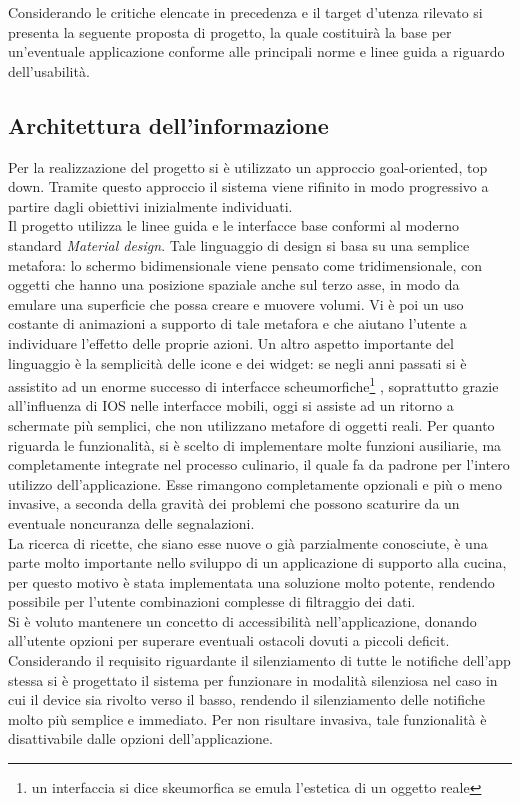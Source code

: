 Considerando le critiche elencate in precedenza e il target d'utenza rilevato si
presenta la seguente proposta di progetto, la quale costituirà la base per
un'eventuale applicazione conforme alle principali norme e linee guida a
riguardo dell'usabilità.

\subsection{Architettura dell'informazione}
Per la realizzazione del progetto si è utilizzato un approccio goal-oriented, top down.
Tramite questo approccio il sistema viene rifinito in modo progressivo a partire dagli
obiettivi inizialmente individuati.\\
Il progetto utilizza le linee guida e le interfacce base conformi al moderno
standard \emph{Material design}. Tale linguaggio di design si basa su una semplice
metafora: lo schermo bidimensionale viene pensato come tridimensionale, con oggetti
che hanno una posizione spaziale anche sul terzo asse, in modo da emulare una superficie
che possa creare e muovere volumi. Vi è poi un uso costante di animazioni a supporto di tale metafora e che
aiutano l'utente a individuare l'effetto delle proprie azioni.
Un altro aspetto importante del linguaggio è la semplicità
delle icone e dei widget: se negli anni passati si è assistito ad un enorme successo di interfacce
scheumorfiche\footnote{un interfaccia si dice skeumorfica se emula l'estetica di un oggetto reale}
, soprattutto grazie all'influenza di IOS nelle interfacce mobili, oggi si assiste
ad un ritorno a schermate più semplici, che non utilizzano metafore di oggetti reali.
Per quanto riguarda le funzionalità, si è scelto di implementare
molte funzioni ausiliarie, ma completamente integrate nel processo
culinario, il quale fa da padrone per l'intero utilizzo dell'applicazione.  Esse
rimangono completamente opzionali e più o meno invasive, a seconda della gravità
dei problemi che possono scaturire da un eventuale noncuranza delle
segnalazioni.\\
La ricerca di ricette, che siano esse nuove o già parzialmente conosciute, è una
parte molto importante nello sviluppo di un applicazione di supporto alla
cucina, per questo motivo è stata implementata una soluzione molto potente, rendendo
possibile per l'utente combinazioni complesse di filtraggio dei dati.\\
Si è voluto mantenere un concetto di accessibilità nell'applicazione, donando
all'utente opzioni per superare eventuali ostacoli dovuti a piccoli deficit.\\
Considerando il requisito riguardante il silenziamento di tutte le notifiche
dell'app stessa si è progettato il sistema per funzionare in modalità silenziosa
nel caso in cui il device sia rivolto verso il basso, rendendo il silenziamento
delle notifiche molto più semplice e immediato.  Per non risultare invasiva,
tale funzionalità è disattivabile dalle opzioni dell'applicazione.

